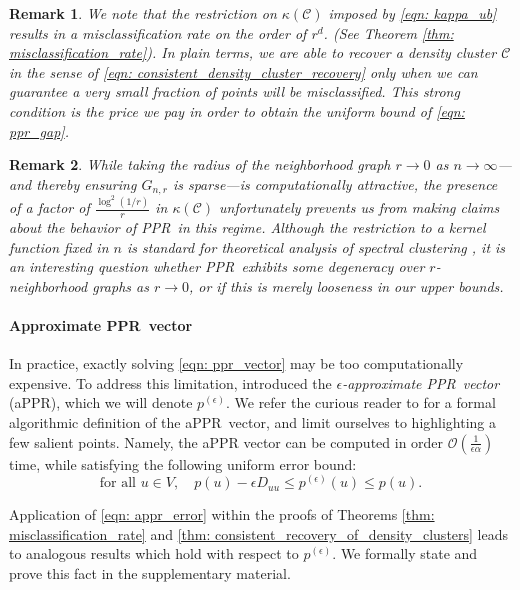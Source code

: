 \documentclass{article}
\newcommand{\1}{\mathbf{1}}
\newcommand{\pbf}{p}        %
\newcommand{\Dbf}{D}
\newcommand{\Cset}{\mathcal{C}}
\newcommand{\pprspace}{{\sc PPR~}}
\theoremstyle{aldenthm}
\theoremstyle{aldenrmrk}
\newtheorem{remark}{Remark}
\begin{document}
\begin{remark}
	We note that the restriction on $\kappa(\Cset)$ imposed by \eqref{eqn: kappa_ub} results in a misclassification rate on the order of $r^d$. (See Theorem \ref{thm: misclassification_rate}). In plain terms, we are able to recover a density cluster $\Cset$ in the sense of \eqref{eqn: consistent_density_cluster_recovery} only when we can guarantee a very small fraction of points will be misclassified. This strong condition is the price we pay in order to obtain the uniform bound of \eqref{eqn: ppr_gap}.
\end{remark}

\begin{remark}
	While taking the radius of the neighborhood graph $r \to 0$ as $n \to \infty$---and thereby ensuring $G_{n,r}$ is sparse---is computationally attractive, the presence of a factor of $\frac{\log^2(1/r)}{r}$ in $\kappa(\Cset)$ unfortunately prevents us from making claims about the behavior of \pprspace in this regime. Although the restriction to a kernel function fixed in $n$ is standard for theoretical analysis of spectral clustering \cite{schiebinger2015,vonluxburg2008}, it is an interesting question whether \pprspace exhibits some degeneracy over $r$-neighborhood graphs as $r \to 0$, or if this is merely looseness in our upper bounds.
\end{remark}

\paragraph{Approximate \pprspace vector}

In practice, exactly solving \eqref{eqn: ppr_vector} may be too computationally expensive. To address this limitation, \citet{andersen2006} introduced the \emph{$\epsilon$-approximate \pprspace vector} (aPPR), which we will denote $\pbf^{(\epsilon)}$. We refer the curious reader to \cite{andersen2006} for a formal algorithmic definition of the a\pprspace vector, and limit ourselves to highlighting a few salient points. Namely, the aPPR vector can be computed in  order $\mathcal{O}\left(\frac{1}{\epsilon \alpha}\right)$ time, while satisfying the following uniform error bound:
\begin{equation}
\label{eqn: appr_error}
\textrm{for all $u \in V$}, \quad \pbf(u) - \epsilon \Dbf_{uu}\leq \pbf^{(\epsilon)}(u) \leq \pbf(u). 
\end{equation}

Application of \eqref{eqn: appr_error} within the proofs of Theorems \ref{thm: misclassification_rate} and \ref{thm: consistent_recovery_of_density_clusters} leads to analogous results which hold with respect to $\pbf^{(\epsilon)}$. We formally state and prove this fact in the supplementary material.
\end{document}
